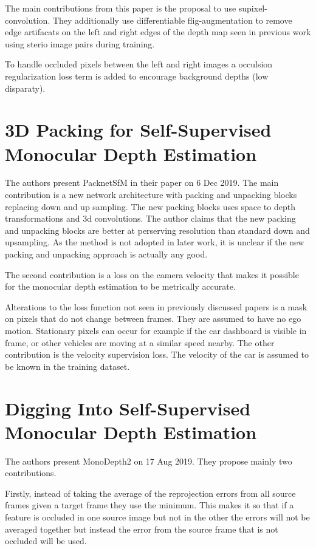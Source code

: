 The main contributions from this paper is the proposal to use supixel-convolution. They additionally use differentiable flig-augmentation to remove edge artifacats on the left and right edges of the depth map seen in previous work using sterio image pairs during training.

To handle occluded pixels between the left and right images a occulsion regularization loss term is added to encourage background depths (low disparaty).

\section{3D Packing for Self-Supervised Monocular Depth Estimation \cite{packnet}}
The authors present PacknetSfM in their paper on 6 Dec 2019. The main contribution is a new network architecture with packing and unpacking blocks replacing down and up sampling. The new packing blocks uses space to depth transformations and 3d convolutions. The author claims that the new packing and unpacking blocks are better at perserving resolution than standard down and upsampling. As the method is not adopted in later work, it is unclear if the new packing and unpacking approach is actually any good.

The second contribution is a loss on the camera velocity that makes it possible for the monocular depth estimation to be metrically accurate.

Alterations to the loss function not seen in previously discussed papers is a mask on pixels that do not change between frames. They are assumed to have no ego motion. Stationary pixels can occur for example if the car dashboard is visible in frame, or other vehicles are moving at a similar speed nearby. The other contribution is the velocity supervision loss. The velocity of the car is assumed to be known in the training dataset.

\section{Digging Into Self-Supervised Monocular Depth Estimation \cite{monodepth2}}
The authors present MonoDepth2 on 17 Aug 2019. They propose mainly two contributions.

Firstly, instead of taking the average of the reprojection errors from all source frames given a target frame they use the minimum. This makes it so that if a feature is occluded in one source image but not in the other the errors will not be averaged together but instead the error from the source frame that is not occluded will be used.

